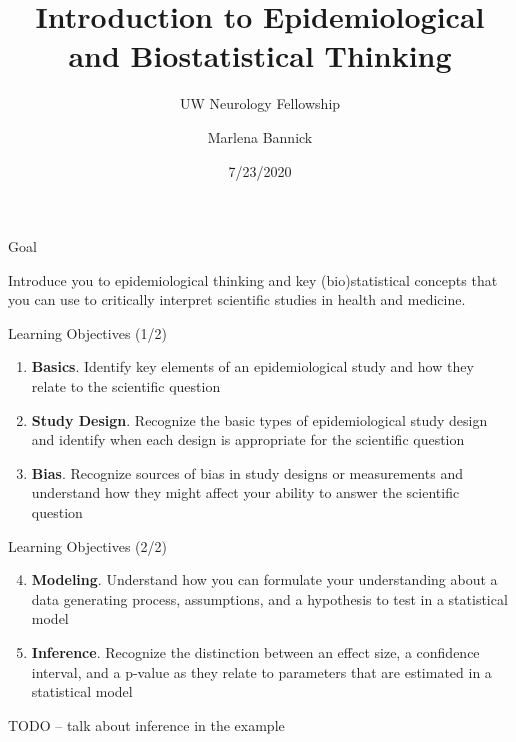 \documentclass[ignorenonframetext,]{beamer}
\title{Introduction to Epidemiological and Biostatistical Thinking}
\subtitle{UW Neurology Fellowship}
\author{Marlena Bannick}
\institute{PhD Student, University of Washington Dept. of Biostatistics\\
Researcher, Institute for Health Metrics and Evaluation}
\date{7/23/2020}
\providecommand{\tightlist}{%
  \setlength{\itemsep}{0pt}\setlength{\parskip}{0pt}}
\begin{document}
\frame{\titlepage}

\begin{frame}{Goal}
\protect\hypertarget{goal}{}

Introduce you to epidemiological thinking and key (bio)statistical
concepts that you can use to critically interpret scientific studies in
health and medicine.

\end{frame}

\begin{frame}{Learning Objectives (1/2)}
\protect\hypertarget{learning-objectives-12}{}

\begin{enumerate}
\tightlist
\item
  \textbf{Basics}. Identify key elements of an epidemiological study and
  how they relate to the scientific question
\item
  \textbf{Study Design}. Recognize the basic types of epidemiological
  study design and identify when each design is appropriate for the
  scientific question
\item
  \textbf{Bias}. Recognize sources of bias in study designs or
  measurements and understand how they might affect your ability to
  answer the scientific question
\end{enumerate}

\end{frame}

\begin{frame}{Learning Objectives (2/2)}
\protect\hypertarget{learning-objectives-22}{}

\begin{enumerate}
\setcounter{enumi}{3}
\tightlist
\item
  \textbf{Modeling}. Understand how you can formulate your understanding
  about a data generating process, assumptions, and a hypothesis to test
  in a statistical model
\item
  \textbf{Inference}. Recognize the distinction between an effect size,
  a confidence interval, and a p-value as they relate to parameters that
  are estimated in a statistical model
\end{enumerate}

TODO -- talk about \beta inference in the example

\end{frame}
\end{document}
